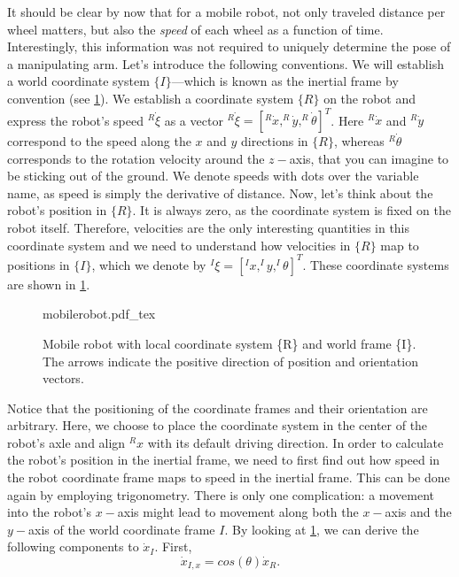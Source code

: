 It should be clear by now that for a mobile robot, not only traveled distance per wheel matters, but also the \textsl{speed} of each wheel as a function of time.
Interestingly, this information was not required to uniquely determine the pose of a manipulating arm.
Let's introduce the following conventions.
We will establish a world coordinate system $\{I\}$---which is known as the inertial frame by convention (see \cref{fig:mobilerobot}).
We establish a coordinate system $\{R\}$ on the robot and express the robot's speed $^R\dot{\xi}$ as a vector $ ^R\dot{\xi}=[^R\dot{x}, ^R\dot{y}, ^R\dot{\theta}]^T$. Here $^R\dot{x}$ and $^R\dot{y}$ correspond to the speed along the $x$ and $y$ directions in $\{R\}$, whereas $^R\dot{\theta}$ corresponds to the rotation velocity around the $z-$axis, that you can imagine to be sticking out of the ground.
We denote speeds with dots over the variable name, as speed is simply the derivative of distance.
Now, let's think about the robot's position in $\{R\}$. It is always zero, as the coordinate system is fixed on the robot itself.
Therefore, velocities are the only interesting quantities in this coordinate system and we need to understand how velocities in $\{R\}$ map to positions in $\{I\}$, which we denote by $^I\xi=[^Ix, ^Iy, ^I\theta]^T$. These coordinate systems are shown in \cref{fig:mobilerobot}.

\begin{figure}[htb!]
    \centering
    \def\svgwidth{0.85\textwidth}
    {mobilerobot.pdf_tex}
    \caption{Mobile robot with local coordinate system \{R\} and world frame \{I\}. The arrows indicate the positive direction of position and orientation vectors.}
    \label{fig:mobilerobot}
\end{figure}

Notice that the positioning of the coordinate frames and their orientation are arbitrary. Here, we choose to place the coordinate system in the center of the robot's axle and align $^Rx$ with its default driving direction.
In order to calculate the robot's position in the inertial frame, we need to first find out how speed in the robot coordinate frame maps to speed in the inertial frame.
This can be done again by employing trigonometry. There is only one complication: a movement into the robot's $x-$axis might lead to movement along both the $x-$axis and the $y-$axis of the world coordinate frame ${I}$. By looking at \cref{fig:mobilerobot}, we can derive the following components to $\dot{x}_I$. First,
\begin{equation}
\dot{x}_{I,x}=cos(\theta) \dot{x}_R.
\end{equation}

